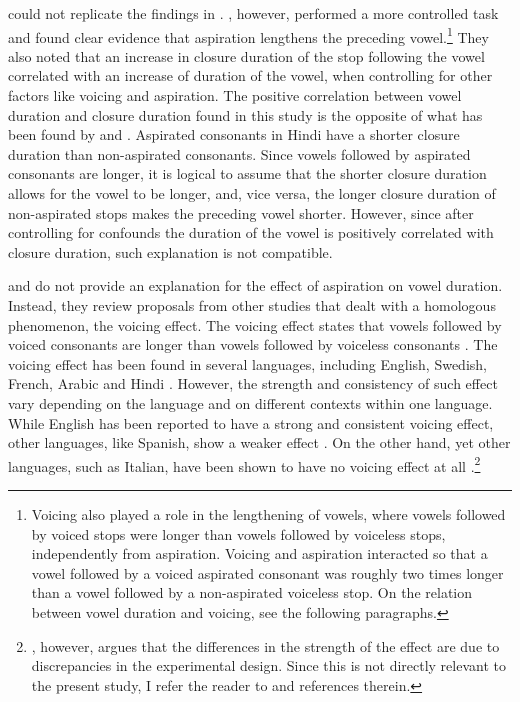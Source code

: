 \documentclass[11pt,a4paper,openany]{memoir}\usepackage[]{graphicx}\usepackage[]{color}
\begin{document}
\citet{lampp2004} could not replicate the findings in \citet{maddieson1976}.
\citet{durvasula2012}, however, performed a more controlled task and found clear evidence that aspiration lengthens the preceding vowel.\footnote{Voicing also played a role in the lengthening of vowels, where vowels followed by voiced stops were longer than vowels followed by voiceless stops, independently from aspiration.
Voicing and aspiration interacted so that a vowel followed by a voiced aspirated consonant was roughly two times longer than a vowel followed by a non-aspirated voiceless stop.
On the relation between vowel duration and voicing, see the following paragraphs.}
They also noted that an increase in closure duration of the stop following the vowel correlated with an increase of duration of the vowel, when controlling for other factors like voicing and aspiration.
The positive correlation between vowel duration and closure duration found in this study is the opposite of what has been found by \citet{maddieson1976} and \citet{lampp2004}.
Aspirated consonants in Hindi have a shorter closure duration than non-aspirated consonants.
Since vowels followed by aspirated consonants are longer, it is logical to assume that the shorter closure duration allows for the vowel to be longer, and, vice versa, the longer closure duration of non-aspirated stops makes the preceding vowel shorter.
However, since after controlling for confounds the duration of the vowel is positively correlated with closure duration, such explanation is not compatible.

\citet{maddieson1976} and \citet{durvasula2012} do not provide an explanation for the effect of aspiration on vowel duration.
Instead, they review proposals from other studies that dealt with a homologous phenomenon, the voicing effect.
The voicing effect states that vowels followed by voiced consonants are longer than vowels followed by voiceless consonants \citep{house1953,chen1970,hussein1994,durvasula2012}.
The voicing effect has been found in several languages, including English, Swedish, French, Arabic and Hindi \citep[191]{soskuthy2013}.
However, the strength and consistency of such effect vary depending on the language and on different contexts within one language.
While English has been reported to have a strong and consistent voicing effect, other languages, like Spanish, show a weaker effect \citep{hussein1994}.
On the other hand, yet other languages, such as Italian, have been shown to have no voicing effect at all \citep{esposito2002}.\footnote{\citet{laeufer1992}, however, argues that the differences in the strength of the effect are due to discrepancies in the experimental design.
Since this is not directly relevant to the present study, I refer the reader to \citet{laeufer1992} and references therein.
} 
\end{document}
